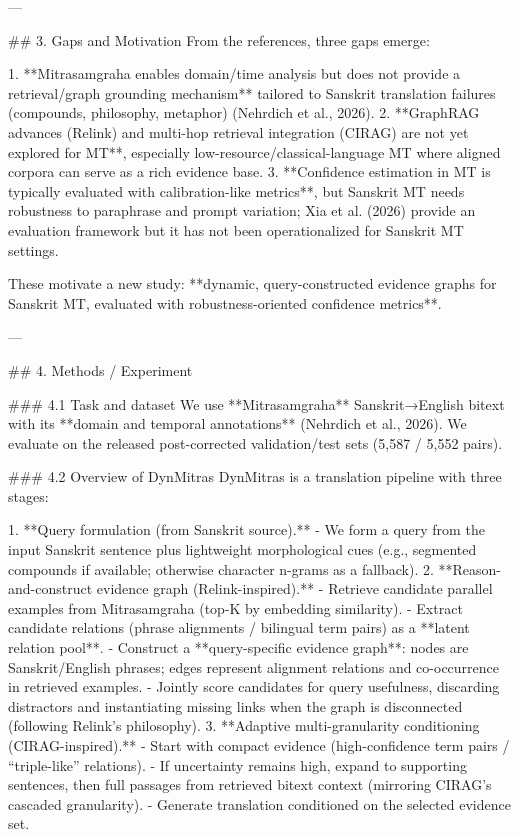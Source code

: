 ---

## 3. Gaps and Motivation  
From the references, three gaps emerge:

1. **Mitrasamgraha enables domain/time analysis but does not provide a retrieval/graph grounding mechanism** tailored to Sanskrit translation failures (compounds, philosophy, metaphor) (Nehrdich et al., 2026).  
2. **GraphRAG advances (Relink) and multi-hop retrieval integration (CIRAG) are not yet explored for MT**, especially low-resource/classical-language MT where aligned corpora can serve as a rich evidence base.  
3. **Confidence estimation in MT is typically evaluated with calibration-like metrics**, but Sanskrit MT needs robustness to paraphrase and prompt variation; Xia et al. (2026) provide an evaluation framework but it has not been operationalized for Sanskrit MT settings.

These motivate a new study: **dynamic, query-constructed evidence graphs for Sanskrit MT, evaluated with robustness-oriented confidence metrics**.

---

## 4. Methods / Experiment  

### 4.1 Task and dataset  
We use **Mitrasamgraha** Sanskrit→English bitext with its **domain and temporal annotations** (Nehrdich et al., 2026). We evaluate on the released post-corrected validation/test sets (5,587 / 5,552 pairs).

### 4.2 Overview of DynMitras  
DynMitras is a translation pipeline with three stages:

1. **Query formulation (from Sanskrit source).**  
   - We form a query from the input Sanskrit sentence plus lightweight morphological cues (e.g., segmented compounds if available; otherwise character n-grams as a fallback).  
2. **Reason-and-construct evidence graph (Relink-inspired).**  
   - Retrieve candidate parallel examples from Mitrasamgraha (top-K by embedding similarity).  
   - Extract candidate relations (phrase alignments / bilingual term pairs) as a **latent relation pool**.  
   - Construct a **query-specific evidence graph**: nodes are Sanskrit/English phrases; edges represent alignment relations and co-occurrence in retrieved examples.  
   - Jointly score candidates for query usefulness, discarding distractors and instantiating missing links when the graph is disconnected (following Relink’s philosophy).  
3. **Adaptive multi-granularity conditioning (CIRAG-inspired).**  
   - Start with compact evidence (high-confidence term pairs / “triple-like” relations).  
   - If uncertainty remains high, expand to supporting sentences, then full passages from retrieved bitext context (mirroring CIRAG’s cascaded granularity).  
   - Generate translation conditioned on the selected evidence set.

